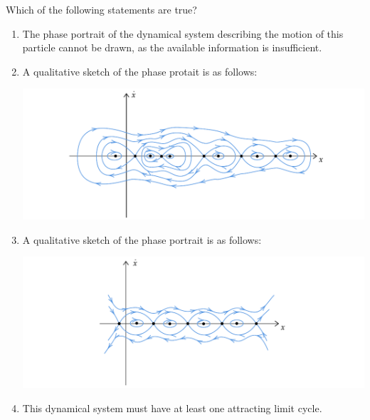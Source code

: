 \documentclass[twoside,10pt,a4paper]{article}
\begin{document}
Which of the following statements are true?

\begin{enumerate}[label=(\alph*)]
	\item The phase portrait of the dynamical system describing the motion of this particle cannot be drawn, as the available information is insufficient.
	\item A qualitative sketch of the phase protait is as follows:
	
	\includegraphics[scale=0.8]{Graphics/MCQ2_figures/Q09D02.pdf}
	\item A qualitative sketch of the phase portrait is as follows:
	
	\includegraphics[scale=0.8]{Graphics/MCQ2_figures/Q09D03.pdf}
	\item This dynamical system must have at least one attracting limit cycle.
\end{enumerate}
\end{document}
